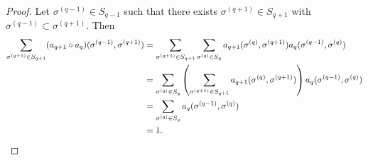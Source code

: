 \documentclass[10pt,a4paper]{amsart}
\begin{document}
\begin{proof}
\noindent
{}
Let $\sigma^{(q-1)} \in S_{q-1}$ such that there exists
$\sigma^{(q+1)} \in S_{q+1}$ with
$\sigma^{(q-1)} \subset \sigma^{(q+1)}$.
Then
\begin{align*}
\sum_{\sigma^{(q+1)} \in S_{q+1}}
(a_{q+1} \circ a_q)(\sigma^{(q-1)}, \sigma^{(q+1)})
&=
\sum_{\sigma^{(q+1)} \in S_{q+1}}
\sum_{\sigma^{(q)} \in S_q}
a_{q+1}(\sigma^{(q)}, \sigma^{(q+1)})
a_q(\sigma^{(q-1)}, \sigma^{(q)}) \notag \\
&=
\sum_{\sigma^{(q)} \in S_q}
\left(
\sum_{\sigma^{(q+1)} \in S_{q+1}}
a_{q+1}(\sigma^{(q)}, \sigma^{(q+1)})
\right)
a_q(\sigma^{(q-1)}, \sigma^{(q)}) \notag \\
&=
\sum_{\sigma^{(q)} \in S_q}
a_q(\sigma^{(q-1)}, \sigma^{(q)}) \notag \\
&= 1.
\end{align*}
\end{proof}
\end{document}
